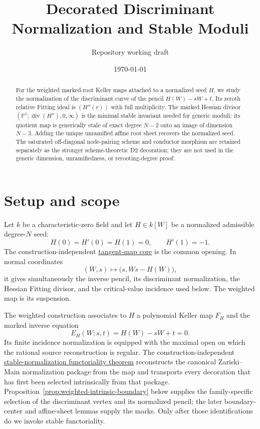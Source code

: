 \documentclass[11pt]{article}
\title{Decorated Discriminant Normalization and Stable Moduli}
\author{Repository working draft}
\date{\today}
\renewcommand{\P}{\mathbb P}
\begin{document}
\maketitle

\begin{abstract}
For the weighted marked-root Keller maps attached to a normalized seed $H$,
we study the normalization of the discriminant curve of the pencil
$H(W)-sW+t$.  Its zeroth relative Fitting ideal is $(H''(r))$ with full
multiplicity.  The marked Hessian divisor
$(\P^1;\operatorname{div}(H''),0,\infty)$ is the minimal stable invariant
needed for generic moduli: its quotient map is generically etale of exact
degree $N-2$ onto an image of dimension $N-3$.  Adding the unique unramified
affine root sheet recovers the normalized seed.  The saturated off-diagonal
node-pairing scheme and conductor morphism are retained separately as the
stronger scheme-theoretic D2 decoration; they are not used in the generic
dimension, unramifiedness, or rerooting-degree proof.
\end{abstract}

\section{Setup and scope}

Let $k$ be a characteristic-zero field and let $H\in k[W]$ be a normalized
admissible degree-$N$ seed:
\[
 H(0)=H'(0)=H(1)=0,\qquad H'(1)=-1.
\]
The construction-independent
\href{../../verified/TANGENT_MAP_CORE.md}{tangent-map core} is the common
opening.  In normal coordinates
\[
 (W,s)\longmapsto\bigl(s,Ws-H(W)\bigr),
\]
it gives simultaneously the inverse pencil, its discriminant normalization,
the Hessian Fitting divisor, and the critical-value incidence used below.
The weighted map is its suspension.

The weighted construction associates to $H$ a polynomial Keller map $F_H$
and the marked inverse equation
\[
 E_H(W;s,t)=H(W)-sW+t=0.
\]
Its finite incidence normalization is equipped with the maximal open on which
the rational source reconstruction is regular.  The construction-independent
\href{../../verified/STABLE_NORMALIZATION_FUNCTORIALITY.md}
{stable-normalization functoriality theorem} reconstructs the canonical
Zariski--Main normalization package from the map and transports every
decoration that has first been selected intrinsically from that package.
Proposition~\ref{prop:weighted-intrinsic-boundary} below supplies the
family-specific selection of the discriminant vertex and its normalized
pencil; the later boundary-center and affine-sheet lemmas supply the marks.
Only after those identifications do we invoke stable functoriality.
\end{document}
